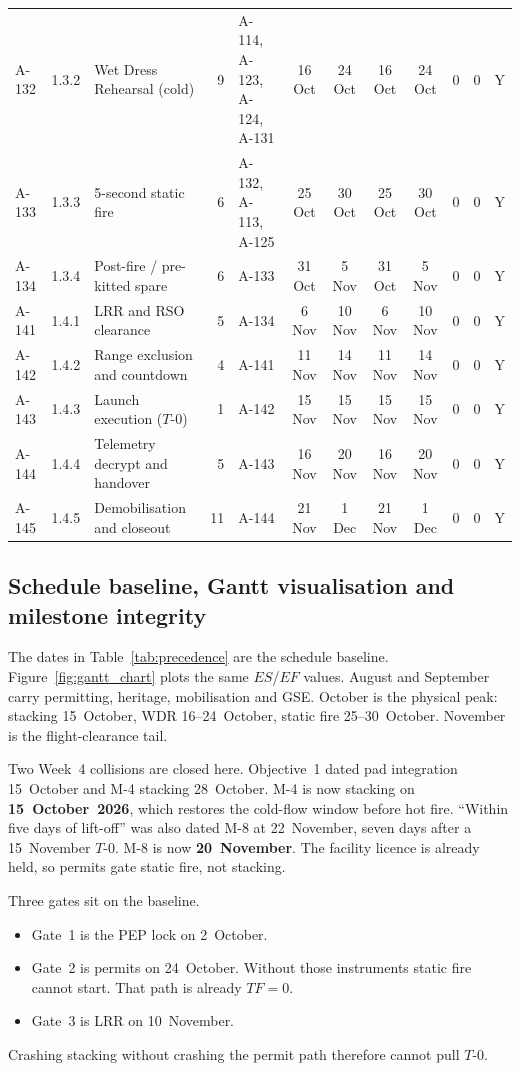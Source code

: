 \begin{landscape}
\begin{longtable}{@{}l l l r l c c c c r r c@{}}
A-132 & 1.3.2 & Wet Dress Rehearsal (cold) & 9 & A-114, A-123, A-124, A-131 & 16 Oct & 24 Oct & 16 Oct & 24 Oct & 0 & 0 & Y \\
A-133 & 1.3.3 & 5-second static fire & 6 & A-132, A-113, A-125 & 25 Oct & 30 Oct & 25 Oct & 30 Oct & 0 & 0 & Y \\
A-134 & 1.3.4 & Post-fire / pre-kitted spare & 6 & A-133 & 31 Oct & 5 Nov & 31 Oct & 5 Nov & 0 & 0 & Y \\
A-141 & 1.4.1 & LRR and RSO clearance & 5 & A-134 & 6 Nov & 10 Nov & 6 Nov & 10 Nov & 0 & 0 & Y \\
A-142 & 1.4.2 & Range exclusion and countdown & 4 & A-141 & 11 Nov & 14 Nov & 11 Nov & 14 Nov & 0 & 0 & Y \\
A-143 & 1.4.3 & Launch execution ($T$-0) & 1 & A-142 & 15 Nov & 15 Nov & 15 Nov & 15 Nov & 0 & 0 & Y \\
A-144 & 1.4.4 & Telemetry decrypt and handover & 5 & A-143 & 16 Nov & 20 Nov & 16 Nov & 20 Nov & 0 & 0 & Y \\
A-145 & 1.4.5 & Demobilisation and closeout & 11 & A-144 & 21 Nov & 1 Dec & 21 Nov & 1 Dec & 0 & 0 & Y \\
\end{longtable}
\end{landscape}

\subsection{Schedule baseline, Gantt visualisation and milestone integrity}
\label{sec:schedule-baseline}

The dates in Table~\ref{tab:precedence} are the schedule baseline. Figure~\ref{fig:gantt_chart} plots the same $ES$/$EF$ values. August and September carry permitting, heritage, mobilisation and GSE. October is the physical peak: stacking 15~October, WDR 16--24~October, static fire 25--30~October. November is the flight-clearance tail.

Two Week~4 collisions are closed here. Objective~1 dated pad integration 15~October and M-4 stacking 28~October. M-4 is now stacking on \textbf{15~October~2026}, which restores the cold-flow window before hot fire. ``Within five days of lift-off'' was also dated M-8 at 22~November, seven days after a 15~November $T$-0. M-8 is now \textbf{20~November}. The facility licence is already held, so permits gate static fire, not stacking.

Three gates sit on the baseline.
\begin{itemize}[leftmargin=1.4em,itemsep=0.25em]
\item Gate~1 is the PEP lock on 2~October.
\item Gate~2 is permits on 24~October. Without those instruments static fire cannot start. That path is already $TF = 0$.
\item Gate~3 is LRR on 10~November.
\end{itemize}
Crashing stacking without crashing the permit path therefore cannot pull $T$-0.

